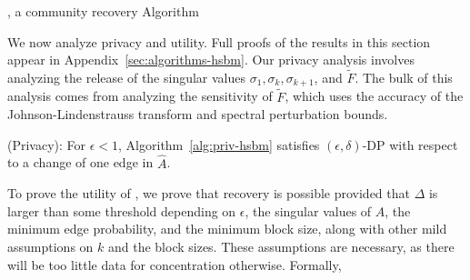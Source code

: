 \begin{algorithm}
\caption{\dpcom{}, a community recovery Algorithm}\label{alg:priv-hsbm}
\begin{algorithmic}
\RETURN{$\perp$}
\ENDIF
{}
\end{algorithmic}
\end{algorithm}
We now analyze privacy and utility. Full proofs of the results in this section appear in Appendix~\ref{sec:algorithms-hsbm}.
Our privacy analysis involves analyzing the release of the singular values $\sigma_1, \sigma_k, \sigma_{k+1}$, and $\tilde{F}$. The bulk of this analysis comes from analyzing the sensitivity of $\tilde{F}$, which uses the accuracy of the Johnson-Lindenstrauss transform and spectral perturbation bounds.
\begin{thm}\label{thm:com-hsbm-priv}
(Privacy): For $\epsilon < 1$, Algorithm~\ref{alg:priv-hsbm} satisfies $(\epsilon, \delta)$-DP with respect to a change of one edge in $\hat{A}$.
\end{thm}
To prove the utility of \dpcom{}, we prove that recovery is possible provided that $\Delta$ is larger than some threshold depending on $\epsilon$, the singular values of $A$, the minimum edge probability, and the minimum block size, along with other mild assumptions on $k$ and the block sizes. These assumptions are necessary, as there will be too little data for concentration otherwise. Formally,
